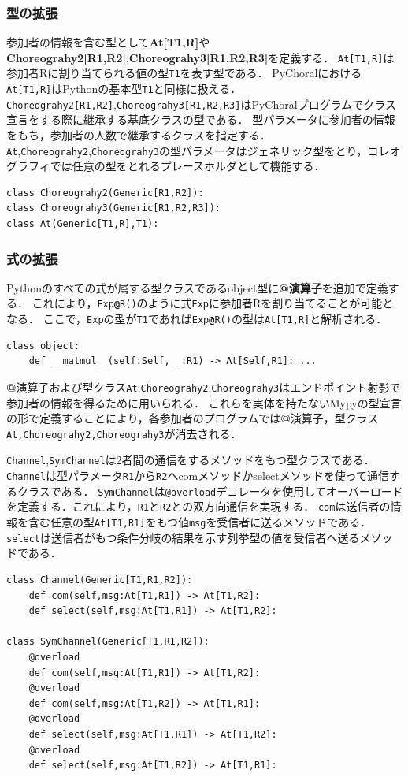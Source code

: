 \documentclass{thesis}
\newcommand{\mblue}[1]{\textbf{\textsf{\color{MidnightBlue}#1}}}
\begin{document}
\subsubsection*{型の拡張}
参加者の情報を含む型として\textbf{At[T1,R]}や\textbf{Choreograhy2[R1,R2]},\textbf{Choreograhy3[R1,R2,R3]}を定義する．
\texttt{At[T1,R]}は参加者Rに割り当てられる値の型\texttt{T1}を表す型である．
PyChoralにおける\texttt{At[T1,R]}はPythonの基本型\texttt{T1}と同様に扱える．
\texttt{Choreograhy2[R1,R2]},\texttt{Choreograhy3[R1,R2,R3]}はPyChoralプログラムでクラス宣言をする際に継承する基底クラスの型である．
型パラメータに参加者の情報をもち，参加者の人数で継承するクラスを指定する．
\texttt{At},\texttt{Choreograhy2},\texttt{Choreograhy3}の型パラメータはジェネリック型をとり，コレオグラフィでは任意の型をとれるプレースホルダとして機能する．
\begin{lstlisting}[frame = none, numbers = none]
class Choreograhy2(Generic[R1,R2]):
class Choreograhy3(Generic[R1,R2,R3]):
class At(Generic[T1,R],T1):
\end{lstlisting}

\subsubsection*{式の拡張}
Pythonのすべての式が属する型クラスである\textsf{object}型に\textbf{\mblue{@}演算子}を追加で定義する．
これにより，\texttt{Exp\mblue{@}R()}のように式\texttt{Exp}に参加者Rを割り当てることが可能となる．
ここで，\texttt{Exp}の型が\texttt{T1}であれば\texttt{Exp\mblue{@}R()}の型は\texttt{At[T1,R]}と解析される．
\begin{lstlisting}[frame =none,numbers = none]
class object:
    def __matmul__(self:Self, _:R1) -> At[Self,R1]: ...
\end{lstlisting}
\mblue{@}演算子および型クラス\texttt{At},\texttt{Choreograhy2},\texttt{Choreograhy3}はエンドポイント射影で参加者の情報を得るために用いられる．
これらを実体を持たないMypyの型宣言の形で定義することにより，各参加者のプログラムでは\mblue{@}演算子，型クラス\texttt{At,Choreograhy2,Choreograhy3}が消去される．%

\texttt{Channel},\texttt{SymChannel}は2者間の通信をするメソッドをもつ型クラスである．
\texttt{Channel}は型パラメータ\texttt{R1}から\texttt{R2}へ\textsf{com}メソッドか\textsf{select}メソッドを使って通信するクラスである．
\texttt{SymChannel}は\texttt{@overload}デコレータを使用してオーバーロードを定義する．これにより，\texttt{R1}と\texttt{R2}との双方向通信を実現する．
\texttt{com}は送信者の情報を含む任意の型\texttt{At[T1,R1]}をもつ値\texttt{msg}を受信者に送るメソッドである．
\texttt{select}は送信者がもつ条件分岐の結果を示す列挙型の値を受信者へ送るメソッドである．
\begin{lstlisting}[numbers = none]
class Channel(Generic[T1,R1,R2]):
    def com(self,msg:At[T1,R1]) -> At[T1,R2]:
    def select(self,msg:At[T1,R1]) -> At[T1,R2]:

class SymChannel(Generic[T1,R1,R2]):
    @overload
    def com(self,msg:At[T1,R1]) -> At[T1,R2]:
    @overload
    def com(self,msg:At[T1,R2]) -> At[T1,R1]:
    @overload
    def select(self,msg:At[T1,R1]) -> At[T1,R2]:
    @overload
    def select(self,msg:At[T1,R2]) -> At[T1,R1]:
\end{lstlisting}
\end{document}

